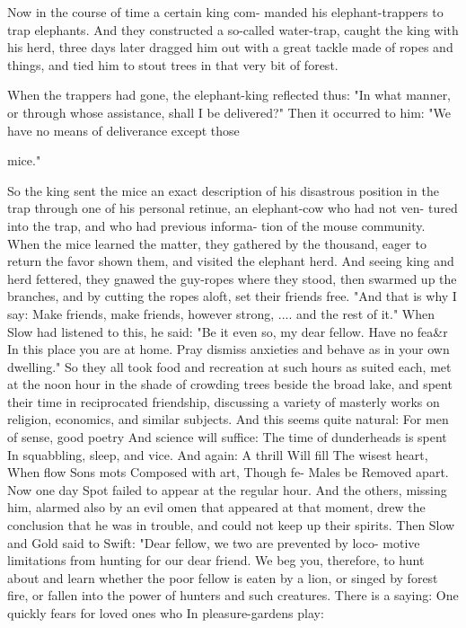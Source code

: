 \documentclass{book}
\begin{document}
Now in the course of time a certain king com-
manded his elephant-trappers to trap elephants. And
they constructed a so-called water-trap, caught the
king with his herd, three days later dragged him out
with a great tackle made of ropes and things, and
tied him to stout trees in that very bit of forest.

When the trappers had gone, the elephant-king
reflected thus: "In what manner, or through whose
assistance, shall I be delivered?" Then it occurred to
him: "We have no means of deliverance except those

mice."

So the king sent the mice an exact description of
his disastrous position in the trap through one of his
personal retinue, an elephant-cow who had not ven-
tured into the trap, and who had previous informa-
tion of the mouse community.
When the mice learned the matter, they gathered
by the thousand, eager to return the favor shown
them, and visited the elephant herd. And seeing
king and herd fettered, they gnawed the guy-ropes
where they stood, then swarmed up the branches,
and by cutting the ropes aloft, set their friends
free.
"And that is why I say:
Make friends, make friends, however strong, ....
and the rest of it."
When Slow had listened to this, he said: "Be it
even so, my dear fellow. Have no fea&r In this place
you are at home. Pray dismiss anxieties and behave
as in your own dwelling." So they all took food and
recreation at such hours as suited each, met at the
noon hour in the shade of crowding trees beside the
broad lake, and spent their time in reciprocated
friendship, discussing a variety of masterly works on
religion, economics, and similar subjects. And this
seems quite natural:
For men of sense, good poetry
And science will suffice:
The time of dunderheads is spent
In squabbling, sleep, and vice.
And again:
A thrill
Will fill
The wisest heart,
When flow
Sons mots
Composed with art,
Though fe-
Males be
Removed apart.
Now one day Spot failed to appear at the regular
hour. And the others, missing him, alarmed also by
an evil omen that appeared at that moment, drew
the conclusion that he was in trouble, and could not
keep up their spirits. Then Slow and Gold said to
Swift: "Dear fellow, we two are prevented by loco-
motive limitations from hunting for our dear friend.
We beg you, therefore, to hunt about and learn
whether the poor fellow is eaten by a lion, or singed
by forest fire, or fallen into the power of hunters and
such creatures. There is a saying:
One quickly fears for loved ones who
In pleasure-gardens play:
\end{document}
